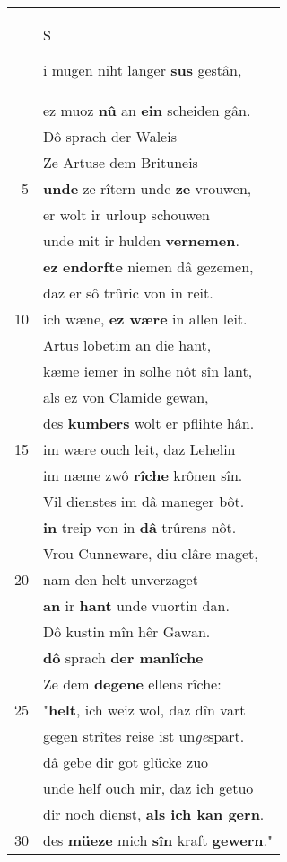 \documentclass[8pt,a4paper,notitlepage]{article}
\begin{document}
\begin{table}[ht]
\begin{minipage}[t]{0.5\linewidth}
\begin{tabular}{rl}
 & \begin{large}S\end{large}i mugen niht langer \textbf{sus} gestân,\\ 
 & ez muoz \textbf{nû} an \textbf{ein} scheiden gân.\\ 
 & Dô sprach der Waleis\\ 
 & Ze Artuse dem Brituneis\\ 
5 & \textbf{unde} ze rîtern unde \textbf{ze} vrouwen,\\ 
 & er wolt ir urloup schouwen\\ 
 & unde mit ir hulden \textbf{vernemen}.\\ 
 & \textbf{ez} \textbf{en}\textbf{dorfte} niemen dâ gezemen,\\ 
 & daz er sô trûric von in reit.\\ 
10 & ich wæne, \textbf{ez wære} in allen leit.\\ 
 & Artus lobetim an die hant,\\ 
 & kæme iemer in solhe nôt sîn lant,\\ 
 & als ez von Clamide gewan,\\ 
 & des \textbf{kumbers} wolt er pflihte hân.\\ 
15 & im wære ouch leit, daz Lehelin\\ 
 & im næme zwô \textbf{rîche} krônen sîn.\\ 
 & Vil dienstes im dâ maneger bôt.\\ 
 & \textbf{in} treip von in \textbf{dâ} trûrens nôt.\\ 
 & Vrou Cunneware, diu clâre maget,\\ 
20 & nam den helt unverzaget\\ 
 & \textbf{an} ir \textbf{hant} unde vuortin dan.\\ 
 & Dô kustin mîn hêr Gawan.\\ 
 & \textbf{dô} sprach \textbf{der manlîche}\\ 
 & Ze dem \textbf{degene} ellens rîche:\\ 
25 & "\textbf{helt}, ich weiz wol, daz dîn vart\\ 
 & gegen strîtes reise ist un\textit{ge}spart.\\ 
 & dâ gebe dir got glücke zuo\\ 
 & unde helf ouch mir, daz ich getuo\\ 
 & dir noch dienst, \textbf{als ich kan gern}.\\ 
30 & des \textbf{müeze} mich \textbf{sîn} kraft \textbf{gewern}."\\ 

\end{tabular}
\end{minipage}
\end{table}
\end{document}
